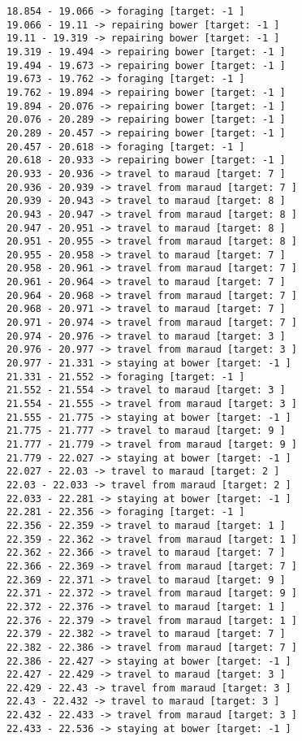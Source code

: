 \documentclass[11pt]{article}
\begin{document}
\begin{Verbatim}[commandchars=\\\{\}]
18.854 - 19.066 -> foraging [target: -1 ]
19.066 - 19.11 -> repairing bower [target: -1 ]
19.11 - 19.319 -> repairing bower [target: -1 ]
19.319 - 19.494 -> repairing bower [target: -1 ]
19.494 - 19.673 -> repairing bower [target: -1 ]
19.673 - 19.762 -> foraging [target: -1 ]
19.762 - 19.894 -> repairing bower [target: -1 ]
19.894 - 20.076 -> repairing bower [target: -1 ]
20.076 - 20.289 -> repairing bower [target: -1 ]
20.289 - 20.457 -> repairing bower [target: -1 ]
20.457 - 20.618 -> foraging [target: -1 ]
20.618 - 20.933 -> repairing bower [target: -1 ]
20.933 - 20.936 -> travel to maraud [target: 7 ]
20.936 - 20.939 -> travel from maraud [target: 7 ]
20.939 - 20.943 -> travel to maraud [target: 8 ]
20.943 - 20.947 -> travel from maraud [target: 8 ]
20.947 - 20.951 -> travel to maraud [target: 8 ]
20.951 - 20.955 -> travel from maraud [target: 8 ]
20.955 - 20.958 -> travel to maraud [target: 7 ]
20.958 - 20.961 -> travel from maraud [target: 7 ]
20.961 - 20.964 -> travel to maraud [target: 7 ]
20.964 - 20.968 -> travel from maraud [target: 7 ]
20.968 - 20.971 -> travel to maraud [target: 7 ]
20.971 - 20.974 -> travel from maraud [target: 7 ]
20.974 - 20.976 -> travel to maraud [target: 3 ]
20.976 - 20.977 -> travel from maraud [target: 3 ]
20.977 - 21.331 -> staying at bower [target: -1 ]
21.331 - 21.552 -> foraging [target: -1 ]
21.552 - 21.554 -> travel to maraud [target: 3 ]
21.554 - 21.555 -> travel from maraud [target: 3 ]
21.555 - 21.775 -> staying at bower [target: -1 ]
21.775 - 21.777 -> travel to maraud [target: 9 ]
21.777 - 21.779 -> travel from maraud [target: 9 ]
21.779 - 22.027 -> staying at bower [target: -1 ]
22.027 - 22.03 -> travel to maraud [target: 2 ]
22.03 - 22.033 -> travel from maraud [target: 2 ]
22.033 - 22.281 -> staying at bower [target: -1 ]
22.281 - 22.356 -> foraging [target: -1 ]
22.356 - 22.359 -> travel to maraud [target: 1 ]
22.359 - 22.362 -> travel from maraud [target: 1 ]
22.362 - 22.366 -> travel to maraud [target: 7 ]
22.366 - 22.369 -> travel from maraud [target: 7 ]
22.369 - 22.371 -> travel to maraud [target: 9 ]
22.371 - 22.372 -> travel from maraud [target: 9 ]
22.372 - 22.376 -> travel to maraud [target: 1 ]
22.376 - 22.379 -> travel from maraud [target: 1 ]
22.379 - 22.382 -> travel to maraud [target: 7 ]
22.382 - 22.386 -> travel from maraud [target: 7 ]
22.386 - 22.427 -> staying at bower [target: -1 ]
22.427 - 22.429 -> travel to maraud [target: 3 ]
22.429 - 22.43 -> travel from maraud [target: 3 ]
22.43 - 22.432 -> travel to maraud [target: 3 ]
22.432 - 22.433 -> travel from maraud [target: 3 ]
22.433 - 22.536 -> staying at bower [target: -1 ]

\end{Verbatim}
\end{document}
